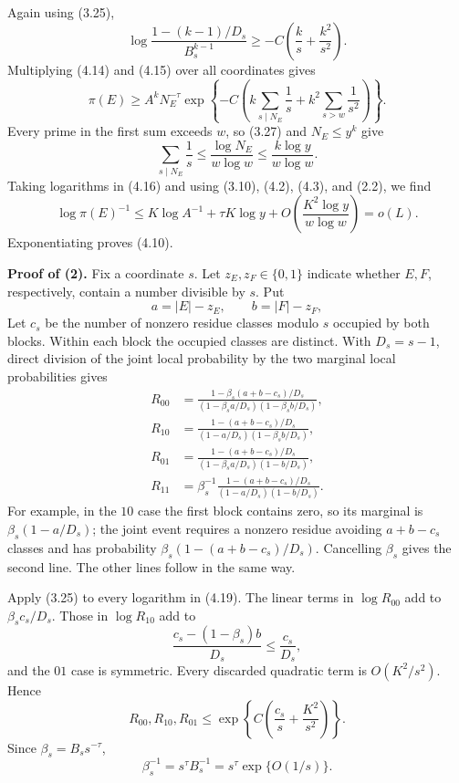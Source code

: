 \documentclass[10pt,letterpaper]{article}
\begin{document}
Again using (3.25),
\begin{equation}
\log\frac{1-(k-1)/D_s}{B_s^{k-1}}
\ge-C\left(\frac{k}{s}+\frac{k^2}{s^2}\right).
\tag{4.15}
\end{equation}
Multiplying (4.14) and (4.15) over all coordinates gives
\begin{equation}
\pi(E)\ge A^kN_E^{-\tau}
\exp\left\{-C\left(k\sum_{s\mid N_E}\frac1s+k^2\sum_{s>w}\frac1{s^2}\right)\right\}.
\tag{4.16}
\end{equation}
Every prime in the first sum exceeds $w$, so (3.27) and $N_E\le y^k$ give
\begin{equation}
\sum_{s\mid N_E}\frac1s\le\frac{\log N_E}{w\log w}\le\frac{k\log y}{w\log w}.
\tag{4.17}
\end{equation}
Taking logarithms in (4.16) and using (3.10), (4.2), (4.3), and (2.2), we find
\begin{equation}
\log\pi(E)^{-1}\le K\log A^{-1}+\tau K\log y
+O\left(\frac{K^2\log y}{w\log w}\right)=o(L).
\tag{4.18}
\end{equation}
Exponentiating proves (4.10).

\textbf{Proof of (2).} Fix a coordinate $s$. Let $z_E,z_F\in\{0,1\}$ indicate whether $E,F$, respectively, contain a number
divisible by $s$. Put
\[
a=|E|-z_E,\qquad b=|F|-z_F,
\]
Let $c_s$ be the number of nonzero residue classes modulo $s$ occupied by both blocks. Within each block the
occupied classes are distinct. With $D_s=s-1$, direct division of the joint local probability by the two marginal
local probabilities gives
\begin{equation}
\begin{aligned}
R_{00}&=\frac{1-\beta_s(a+b-c_s)/D_s}{(1-\beta_sa/D_s)(1-\beta_sb/D_s)},\\
R_{10}&=\frac{1-(a+b-c_s)/D_s}{(1-a/D_s)(1-\beta_sb/D_s)},\\
R_{01}&=\frac{1-(a+b-c_s)/D_s}{(1-\beta_sa/D_s)(1-b/D_s)},\\
R_{11}&=\beta_s^{-1}\frac{1-(a+b-c_s)/D_s}{(1-a/D_s)(1-b/D_s)}.
\end{aligned}
\tag{4.19}
\end{equation}
For example, in the $10$ case the first block contains zero, so its marginal is $\beta_s(1-a/D_s)$; the joint event
requires a nonzero residue avoiding $a+b-c_s$ classes and has probability $\beta_s(1-(a+b-c_s)/D_s)$. Cancelling $\beta_s$
gives the second line. The other lines follow in the same way.

Apply (3.25) to every logarithm in (4.19). The linear terms in $\log R_{00}$ add to $\beta_sc_s/D_s$. Those in $\log R_{10}$ add
to
\[
\frac{c_s-(1-\beta_s)b}{D_s}\le\frac{c_s}{D_s},
\]
and the $01$ case is symmetric. Every discarded quadratic term is $O(K^2/s^2)$. Hence
\begin{equation}
R_{00},R_{10},R_{01}\le\exp\left\{C\left(\frac{c_s}{s}+\frac{K^2}{s^2}\right)\right\}.
\tag{4.20}
\end{equation}
Since $\beta_s=B_ss^{-\tau}$,
\[
\beta_s^{-1}=s^\tau B_s^{-1}=s^\tau\exp\{O(1/s)\}.
\]
\end{document}
